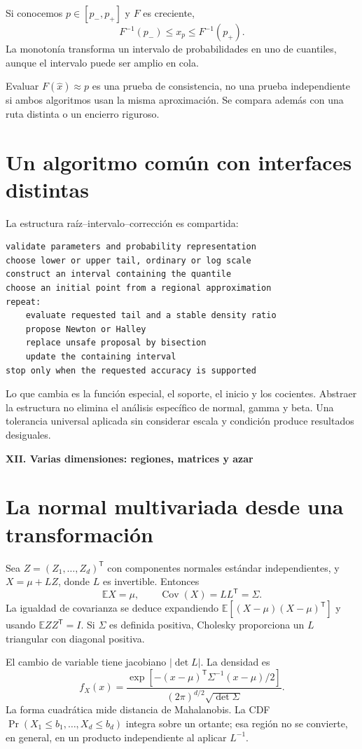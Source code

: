 \documentclass[11pt,a4paper]{article}
\newcommand{\E}{\mathbb E}
\newcommand{\T}{^{\mathsf T}}
\DeclareMathOperator{\Cov}{Cov}
\theoremstyle{definition}
\newcommand{\parte}[1]{\par\bigskip\Needspace{8\baselineskip}\begin{center}{\Large\bfseries\color{azul}#1}\end{center}}
\begin{document}
Si conocemos $p\in[p_-,p_+]$ y $F$ es creciente,
\[
F^{-1}(p_-)\le x_p\le F^{-1}(p_+).
\]
La monotonía transforma un intervalo de probabilidades en uno de cuantiles, aunque el intervalo puede ser amplio en cola.

Evaluar $F(\widehat x)\approx p$ es una prueba de consistencia, no una prueba independiente si ambos algoritmos usan la misma aproximación. Se compara además con una ruta distinta o un encierro riguroso.

\section{Un algoritmo común con interfaces distintas}
La estructura raíz--intervalo--corrección es compartida:
\begin{lstlisting}
validate parameters and probability representation
choose lower or upper tail, ordinary or log scale
construct an interval containing the quantile
choose an initial point from a regional approximation
repeat:
    evaluate requested tail and a stable density ratio
    propose Newton or Halley
    replace unsafe proposal by bisection
    update the containing interval
stop only when the requested accuracy is supported
\end{lstlisting}
Lo que cambia es la función especial, el soporte, el inicio y los cocientes. Abstraer la estructura no elimina el análisis específico de normal, gamma y beta. Una tolerancia universal aplicada sin considerar escala y condición produce resultados desiguales.


\parte{XII. Varias dimensiones: regiones, matrices y azar}
\section{La normal multivariada desde una transformación}
Sea $Z=(Z_1,\ldots,Z_d)\T$ con componentes normales estándar independientes, y $X=\mu+LZ$, donde $L$ es invertible. Entonces
\[
\E X=\mu,\qquad \Cov(X)=LL\T=\Sigma.
\]
La igualdad de covarianza se deduce expandiendo $\E[(X-\mu)(X-\mu)\T]$ y usando $\E ZZ\T=I$. Si $\Sigma$ es definida positiva, Cholesky proporciona un $L$ triangular con diagonal positiva.

El cambio de variable tiene jacobiano $|\det L|$. La densidad es
\[
f_X(x)=\frac{\exp[-(x-\mu)\T\Sigma^{-1}(x-\mu)/2]}
{(2\pi)^{d/2}\sqrt{\det\Sigma}}.
\]
La forma cuadrática mide distancia de Mahalanobis. La CDF
$\Pr(X_1\le b_1,\ldots,X_d\le b_d)$ integra sobre un ortante; esa región no se convierte, en general, en un producto independiente al aplicar $L^{-1}$.
\end{document}
